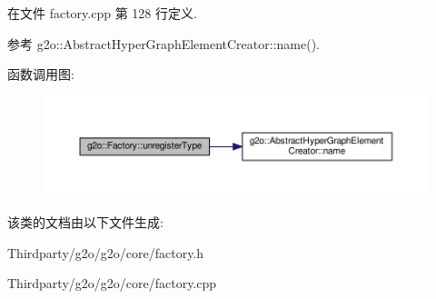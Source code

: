 在文件 factory.\-cpp 第 128 行定义.



参考 g2o\-::\-Abstract\-Hyper\-Graph\-Element\-Creator\-::name().



函数调用图\-:
\nopagebreak
\begin{figure}[H]
\begin{center}
\leavevmode
\includegraphics[width=350pt]{classg2o_1_1Factory_a01b16c7d5a49ddab5ccd5980f76900b7_cgraph}
\end{center}
\end{figure}




该类的文档由以下文件生成\-:\begin{DoxyCompactItemize}
\item 
Thirdparty/g2o/g2o/core/factory.\-h\item 
Thirdparty/g2o/g2o/core/factory.\-cpp\end{DoxyCompactItemize}
